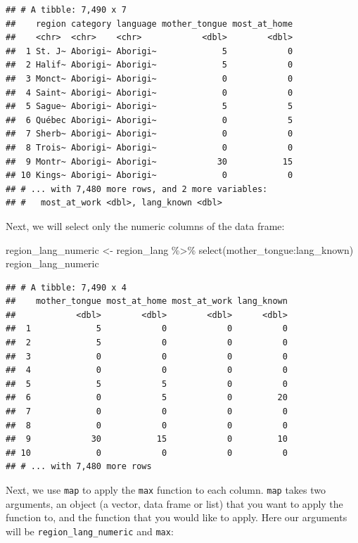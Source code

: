 \documentclass[
]{krantz}
\makeatletter
\newenvironment{Shaded}{\begin{snugshade}}{\end{snugshade}}
\newcommand{\FunctionTok}[1]{\textcolor[rgb]{0,0,0}{#1}}
\newcommand{\NormalTok}[1]{#1}
\newcommand{\OtherTok}[1]{\textcolor[rgb]{0.37,0.37,0.37}{#1}}
\newcommand{\SpecialCharTok}[1]{\textcolor[rgb]{0,0,0}{#1}}
\newenvironment{kframe}{%
\medskip{}
\setlength{\fboxsep}{.8em}
 \def\at@end@of@kframe{}%
 \ifinner\ifhmode%
  \def\at@end@of@kframe{\end{minipage}}%
  \begin{minipage}{\columnwidth}%
 \fi\fi%
 \def\FrameCommand##1{\hskip\@totalleftmargin \hskip-\fboxsep
 \colorbox{shadecolor}{##1}\hskip-\fboxsep
     \hskip-\linewidth \hskip-\@totalleftmargin \hskip\columnwidth}%
 \MakeFramed {\advance\hsize-\width
   \@totalleftmargin\z@ \linewidth\hsize
   \@setminipage}}%
 {\par\unskip\endMakeFramed%
 \at@end@of@kframe}
\renewenvironment{Shaded}{\begin{kframe}}{\end{kframe}}
\makeatother
\begin{document}
\begin{verbatim}
## # A tibble: 7,490 x 7
##    region category language mother_tongue most_at_home
##    <chr>  <chr>    <chr>            <dbl>        <dbl>
##  1 St. J~ Aborigi~ Aborigi~             5            0
##  2 Halif~ Aborigi~ Aborigi~             5            0
##  3 Monct~ Aborigi~ Aborigi~             0            0
##  4 Saint~ Aborigi~ Aborigi~             0            0
##  5 Sague~ Aborigi~ Aborigi~             5            5
##  6 Québec Aborigi~ Aborigi~             0            5
##  7 Sherb~ Aborigi~ Aborigi~             0            0
##  8 Trois~ Aborigi~ Aborigi~             0            0
##  9 Montr~ Aborigi~ Aborigi~            30           15
## 10 Kings~ Aborigi~ Aborigi~             0            0
## # ... with 7,480 more rows, and 2 more variables:
## #   most_at_work <dbl>, lang_known <dbl>
\end{verbatim}

Next, we will select only the numeric columns of the data frame:

\begin{Shaded}
\begin{Highlighting}[]
\NormalTok{region\_lang\_numeric }\OtherTok{\textless{}{-}}\NormalTok{ region\_lang }\SpecialCharTok{\%\textgreater{}\%}
  \FunctionTok{select}\NormalTok{(mother\_tongue}\SpecialCharTok{:}\NormalTok{lang\_known)}
\NormalTok{region\_lang\_numeric}
\end{Highlighting}
\end{Shaded}

\begin{verbatim}
## # A tibble: 7,490 x 4
##    mother_tongue most_at_home most_at_work lang_known
##            <dbl>        <dbl>        <dbl>      <dbl>
##  1             5            0            0          0
##  2             5            0            0          0
##  3             0            0            0          0
##  4             0            0            0          0
##  5             5            5            0          0
##  6             0            5            0         20
##  7             0            0            0          0
##  8             0            0            0          0
##  9            30           15            0         10
## 10             0            0            0          0
## # ... with 7,480 more rows
\end{verbatim}

Next, we use \texttt{map} to apply the \texttt{max} function to each column. \texttt{map} takes two arguments, an object (a vector, data frame or list) that you want
to apply the function to, and the function that you would like to apply. Here our arguments will be \texttt{region\_lang\_numeric} and \texttt{max}:
\end{document}
